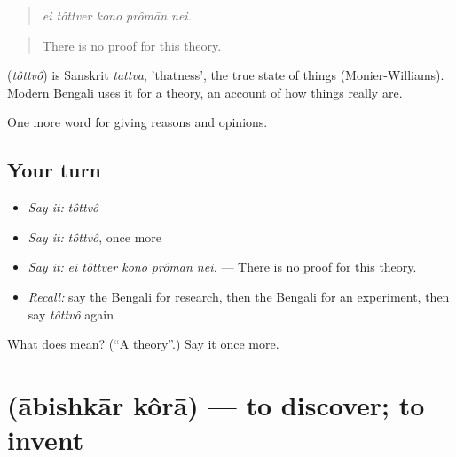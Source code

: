 \begin{quote}
    
\end{quote}

\begin{quote}
\emph{ei tôttver kono prômān nei.}
\end{quote}

\begin{quote}
There is no proof for this theory.
\end{quote}

\begin{cousinweb}
\textbf{} (\emph{tôttvô}) is Sanskrit \emph{tattva}, 'thatness', the true state of things (Monier-Williams). Modern Bengali uses it for a theory, an account of how things really are.
\end{cousinweb}

\begin{grammarlens}[title={What you've built}]
One more word for giving reasons and opinions.
\end{grammarlens}

\subsection*{Your turn}
\begin{itemize}
\raggedright
  \item \emph{Say it:} \emph{tôttvô}
  \item \emph{Say it:} \emph{tôttvô}, once more
  \item \emph{Say it:} \emph{ei tôttver kono prômān nei.} — There is no proof for this theory.
  \item \emph{Recall:} say the Bengali for research, then the Bengali for an experiment, then say \emph{tôttvô} again
\end{itemize}

\begin{tcolorbox}[breakable,colback=teal!4,colframe=teal!35!black,title={Before you move on}]
What does  mean? (\textquotedblleft{}A theory\textquotedblright{}.) Say it once more.
\end{tcolorbox}
\section[\texorpdfstring{\bn{আবিষ্কার} \bn{করা} (ābishkār kôrā)}{আবিষ্কার করা (ābishkār kôrā)}]{  (ābishkār kôrā) — to discover; to invent}

